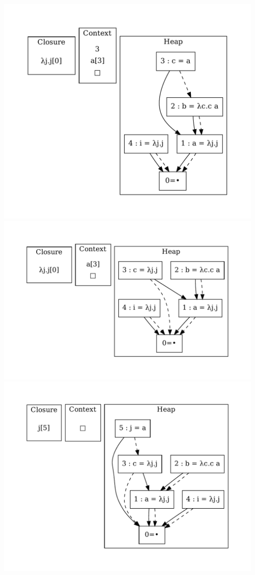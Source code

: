 \includegraphics[width=\linewidth/2]{figures/17.pdf}
\includegraphics[width=\linewidth/2]{figures/18.pdf}
\includegraphics[width=\linewidth/2]{figures/19.pdf}
